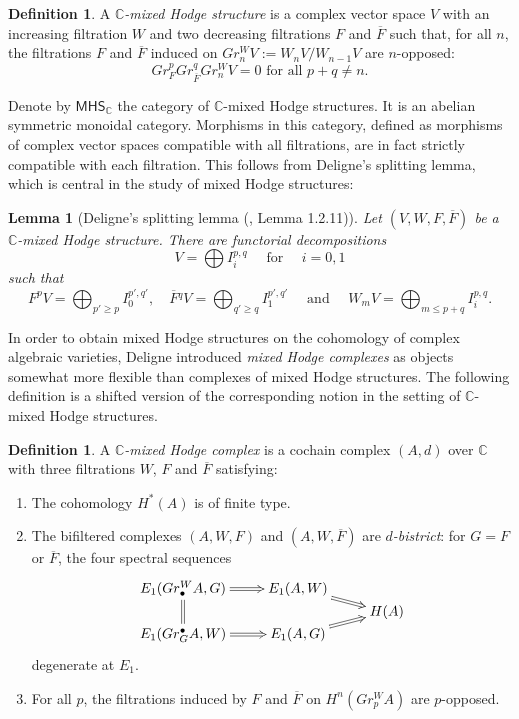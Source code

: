 \documentclass[a4paper]{amsart}
\newtheorem{lemm}[theo]{Lemma}
\theoremstyle{definition}
\newtheorem{defi}[theo]{Definition}
\theoremstyle{theorem}
\newcommand{\CC}{\mathbb{C}}
\newcommand{\ov}{\overline}
\newcommand{\MHS}{{\mathsf{MHS}}}
\begin{document}
\begin{defi}A \textit{$\CC$-mixed Hodge structure} is a complex vector space $V$ with an
increasing filtration $W$ and two decreasing filtrations $F$ and $\ov{F}$ 
such that, for all $n$, the filtrations 
$F$ and $\ov{F}$ induced on $Gr_n^WV:=W_{n}V/W_{n-1}V$ are $n$-opposed:
\[Gr^p_FGr^q_{\ov F}Gr_n^W V=0\text{ for all }p+q\neq n.\]
\end{defi}
Denote by $\MHS_\CC$ the category of $\CC$-mixed Hodge structures. It is an abelian symmetric monoidal category.
Morphisms in this category, defined as morphisms of complex vector spaces compatible with all filtrations, 
are in fact strictly compatible with each filtration. This follows from Deligne's splitting lemma,
which is central in the study of mixed Hodge structures:

\begin{lemm}[Deligne's splitting lemma (\cite{DeHII}, Lemma 1.2.11)]\label{DelSplit}
Let $(V,W,F,\ov F)$ be a $\CC$-mixed Hodge structure. There are functorial decompositions
\[V=\bigoplus I^{p,q}_i\quad \text{ for }\quad i=0,1\]
 such that 
 \[F^pV=\bigoplus_{p'\geq p} I^{p',q'}_0,\quad\ov{F}{}^qV=\bigoplus_{q'\geq q} I^{p',q'}_1\quad\text{ and }\quad W_mV=\bigoplus_{m\leq p+q}I^{p,q}_i.\]
\end{lemm}



In order to obtain mixed Hodge structures on the cohomology of complex algebraic varieties, Deligne \cite{DeHIII} introduced \textit{mixed Hodge complexes} as
objects somewhat more flexible than complexes of mixed Hodge structures. The following definition is a shifted version of the corresponding notion 
in the setting of $\CC$-mixed Hodge structures.


\begin{defi}
 A \textit{$\CC$-mixed Hodge complex} is a cochain complex $(A,d)$ over $\CC$ with three filtrations $W$, $F$ and $\ov{F}$ satisfying:
\begin{enumerate}
 \item [$(H_0)$] The cohomology $H^*(A)$ is of finite type.
 \item [$(H_1)$] The bifiltered complexes $(A,W,F)$ and $(A,W,\ov F)$ are \textit{$d$-bistrict}: for $G=F$ or $\ov F$,
 the four spectral sequences
$$
\xymatrix@R=.0pc{
E_1(Gr^W_\bullet A,G)\ar@{=}[dd]\ar@{=>}[r]&E_1(A,W)\ar@{=>}[rd]\\
&&H(A)\\
E_1(Gr_G^\bullet A,W)\ar@{=>}[r]&E_1(A,G)\ar@{=>}[ru]\\
}
$$
degenerate at $E_1$.
 \item [$(H_2)$] For all $p$, the filtrations induced by $F$ and $\ov{F}$ on $H^n(Gr_p^WA)$ are $p$-opposed. 
\end{enumerate}
\end{defi}
\end{document}
